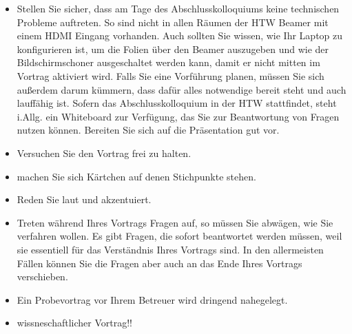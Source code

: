 \begin{itemize}

\item 
Stellen Sie sicher, dass am Tage des Abschlusskolloquiums keine technischen Probleme auftreten. So sind nicht in allen Räumen der HTW Beamer mit einem HDMI Eingang vorhanden. Auch sollten Sie wissen, wie Ihr Laptop zu konfigurieren ist, um die Folien über den Beamer auszugeben und wie der Bildschirmschoner ausgeschaltet werden kann, damit er nicht mitten im Vortrag aktiviert wird. Falls Sie eine Vorführung planen, müssen Sie sich außerdem darum kümmern, dass dafür alles notwendige bereit steht und auch lauffähig ist. Sofern das Abschlusskolloquium in der HTW stattfindet, steht i.Allg. ein Whiteboard zur Verfügung, das Sie zur Beantwortung von Fragen nutzen können. Bereiten Sie sich auf die Präsentation gut vor. 


\item Versuchen Sie den Vortrag frei zu halten. 
\item machen Sie sich Kärtchen auf denen Stichpunkte stehen.
\item 
Reden Sie laut und akzentuiert. 
\item Treten während Ihres Vortrags Fragen auf, so müssen Sie abwägen, wie Sie verfahren wollen. Es gibt Fragen, die sofort beantwortet werden müssen, weil sie essentiell für das Verständnis Ihres Vortrags sind. In den allermeisten Fällen können Sie die Fragen aber auch an das Ende Ihres Vortrags verschieben.
\item Ein Probevortrag vor Ihrem Betreuer wird dringend nahegelegt.



\item wissneschaftlicher Vortrag!!
\end{itemize}


















 




